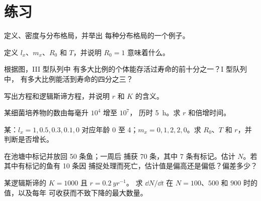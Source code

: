 \section{练习}

\begin{exercise}[$\star$]\label{exo:b1:populations:1}
定义、密度与分布格局，并举出
每种分布格局的一个例子。
\end{exercise}

\begin{exercise}[$\star$]\label{exo:b1:populations:2}
定义 $l_x$、$m_x$、$R_0$ 和 $T$，并说明 $R_0 = 1$ 意味着什么。
\end{exercise}

\begin{exercise}[$\star$]\label{exo:b1:populations:3}
根据图，III 型队列中
有多大比例的个体能存活过寿命的前十分之一？I 型队列中，
有多大比例能活到寿命的四分之三？
\end{exercise}

\begin{exercise}[$\star$]\label{exo:b1:populations:4}
写出方程和逻辑斯谛方程，并说明 $r$ 和 $K$
的含义。
\end{exercise}

\begin{exercise}[$\star\star$]\label{exo:b1:populations:5}
某细菌培养物的数由每毫升 $10^4$ 增至 $10^7$，
历时 \qty{5}{h}。求 $r$ 和倍增时间。
\end{exercise}

\begin{exercise}[$\star\star$]\label{exo:b1:populations:6}
某：$l_x = 1, 0.5, 0.3, 0.1, 0$ 对应年龄 0 至 4；$m_x = 0,
1, 2, 2, 0$。求 $R_0$、$T$ 和 $r$，并
判断是否增长。
\end{exercise}

\begin{exercise}[$\star\star$]\label{exo:b1:populations:7}
在池塘中标记并放回 50 条鱼；一周后
捕获 70 条，其中 7 条有标记。估计 $N$。若其中有标记的鱼有 10 条因
捕捉处理而死亡，估计值是偏高还是偏低？偏差多少？
\end{exercise}

\begin{exercise}[$\star\star$]\label{exo:b1:populations:8}
某逻辑斯谛的 $K = 1000$ 且 $r = \qty{0.2}{yr^{-1}}$。
求 $\dd N/\dd t$ 在 $N = 100$、$500$ 和 $900$ 时的值，以及每年
可收获而不致下降的最大数量。
\end{exercise}

